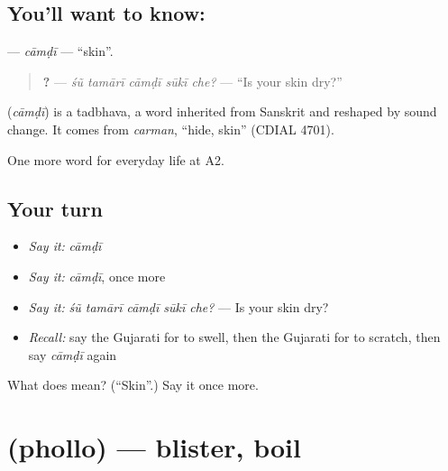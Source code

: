 \subsection*{You'll want to know: }
\textbf{} — \emph{cāmḍī} — \textquotedblleft{}skin\textquotedblright{}.

\begin{quote}
\textbf{    ?} — \emph{śũ tamārī cāmḍī sūkī che?} — \textquotedblleft{}Is your skin dry?\textquotedblright{}
\end{quote}

\begin{cousinweb}
\textbf{} (\emph{cāmḍī}) is a tadbhava, a word inherited from Sanskrit and reshaped by sound change. It comes from \emph{carman}, \textquotedblleft{}hide, skin\textquotedblright{} (CDIAL 4701).
\end{cousinweb}

\begin{grammarlens}[title={What you've built}]
One more word for everyday life at A2.
\end{grammarlens}

\subsection*{Your turn}
\begin{itemize}
\raggedright
  \item \emph{Say it:} \emph{cāmḍī}
  \item \emph{Say it:} \emph{cāmḍī}, once more
  \item \emph{Say it:} \emph{śũ tamārī cāmḍī sūkī che?} — Is your skin dry?
  \item \emph{Recall:} say the Gujarati for to swell, then the Gujarati for to scratch, then say \emph{cāmḍī} again
\end{itemize}

\begin{tcolorbox}[breakable,colback=teal!4,colframe=teal!35!black,title={Before you move on}]
What does  mean? (\textquotedblleft{}Skin\textquotedblright{}.) Say it once more.
\end{tcolorbox}
\section[\texorpdfstring{\gu{ફોલ્લો} (phollo)}{ફોલ્લો (phollo)}]{ (phollo) — blister, boil}

\label{lesson:GU-C228-phollo}



